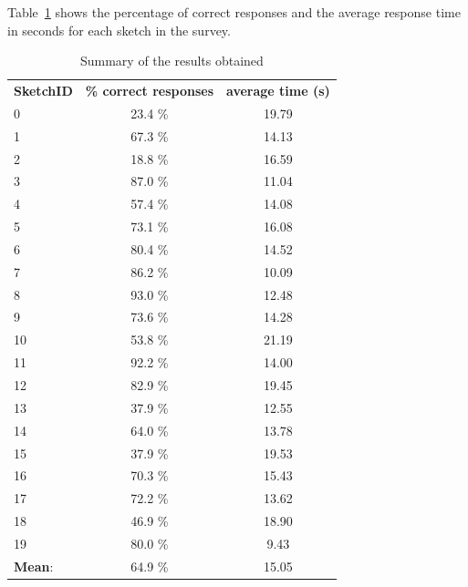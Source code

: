 
   

\noindent Table~\ref{tab:responses summary} shows the percentage of correct responses and the average response time in seconds for each sketch in the survey.
\begin{table}[!ht]
\begin{center}
    \begin{tabular}{lcc}
    \textbf{SketchID} & \textbf{\% correct responses} & \textbf{average time (s)} \\
    0 & 23.4 \%  & 19.79 \\
    1 & 67.3 \%  & 14.13 \\
    2 & 18.8 \%  & 16.59\\
    3 & 87.0 \%  & 11.04 \\
    4 & 57.4 \%  & 14.08 \\
    5 & 73.1 \%  & 16.08 \\
    6 & 80.4 \%  & 14.52 \\
    7 & 86.2 \%  & 10.09 \\
    8 & 93.0 \%  & 12.48 \\
    9 & 73.6 \%  & 14.28 \\
    10 & 53.8 \%  & 21.19 \\
    11 & 92.2 \%  & 14.00 \\
    12 & 82.9 \%  & 19.45 \\
    13 & 37.9 \%  & 12.55 \\
    14 & 64.0 \%  & 13.78 \\
    15 & 37.9 \%  & 19.53 \\
    16 & 70.3 \%  & 15.43 \\
    17 & 72.2 \%  & 13.62 \\
    18 & 46.9 \%  & 18.90 \\
    19 & 80.0 \%  & 9.43 \\
    \hline
    \hline
    \textbf{Mean}: & 64.9 \% & 15.05
    \end{tabular}
     \caption{\label{tab:responses summary}Summary of the results obtained}
\end{center}
\end{table}
